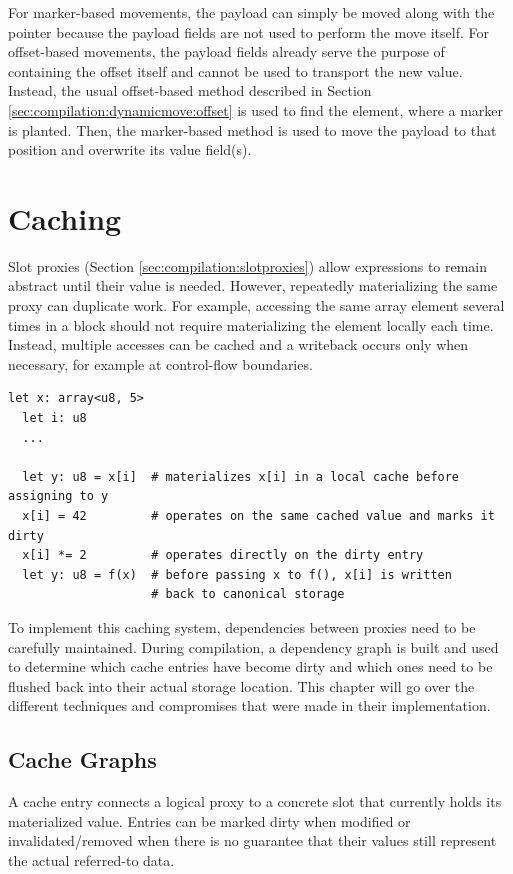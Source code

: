 For marker-based movements, the payload can simply be moved along with the pointer because the payload fields are not used to perform the move itself. For offset-based movements, the payload fields already serve the purpose of containing the offset itself and cannot be used to transport the new value. Instead, the usual offset-based method described in Section \ref{sec:compilation:dynamicmove:offset} is used to find the element, where a marker is planted. Then, the marker-based method is used to move the payload to that position and overwrite its value field(s).

\chapter{Caching} \label{sec:compilation:cache}
Slot proxies (Section \ref{sec:compilation:slotproxies}) allow expressions to remain abstract until their value is needed. However, repeatedly materializing the same proxy can duplicate work. For example, accessing the same array element several times in a block should not require materializing the element locally each time. Instead, multiple accesses can be cached and a writeback occurs only when necessary, for example at control-flow boundaries.

\vspace{0.5cm}\noindent\begin{minipage}{\textwidth}
\begin{lstlisting}[style=pseudocode]
  let x: array<u8, 5>
  let i: u8
  ...

  let y: u8 = x[i]  # materializes x[i] in a local cache before assigning to y
  x[i] = 42         # operates on the same cached value and marks it dirty
  x[i] *= 2         # operates directly on the dirty entry
  let y: u8 = f(x)  # before passing x to f(), x[i] is written
                    # back to canonical storage
\end{lstlisting}
\end{minipage}

To implement this caching system, dependencies between proxies need to be carefully maintained. During compilation, a dependency graph is built and used to determine which cache entries have become dirty and which ones need to be flushed back into their actual storage location. This chapter will go over the different techniques and compromises that were made in their implementation.

\section{Cache Graphs}\label{sec:compilation:cachegraphs}
A cache entry connects a logical proxy to a concrete slot that currently holds its materialized value. Entries can be marked dirty when modified or invalidated/removed when there is no guarantee that their values still represent the actual referred-to data.


